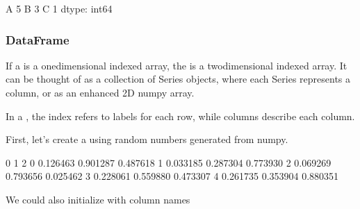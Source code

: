 \documentclass[letterpaper,10pt,english]{sphinxmanual}
\begin{document}
\begin{sphinxVerbatim}[commandchars=\\\{\}]
A    5
B    3
C    1
dtype: int64
\end{sphinxVerbatim}


\subsubsection{DataFrame}
\label{\detokenize{content/Introduction_to_Pandas:dataframe}}
If a  is a one\sphinxhyphen{}dimensional indexed array, the  is a two\sphinxhyphen{}dimensional indexed array. It can be thought of as a collection of Series objects, where each Series represents a column, or as an enhanced 2D numpy array.

In a , the index refers to labels for each row, while columns describe each column.

First, let’s create a  using random numbers generated from numpy.

\begin{sphinxVerbatim}[commandchars=\\\{\}]
   

   
\end{sphinxVerbatim}

\begin{sphinxVerbatim}[commandchars=\\\{\}]
          0         1         2
0  0.126463  0.901287  0.487618
1  0.033185  0.287304  0.773930
2  0.069269  0.793656  0.025462
3  0.228061  0.559880  0.473307
4  0.261735  0.353904  0.880351
\end{sphinxVerbatim}

We could also initialize with column names

\begin{sphinxVerbatim}[commandchars=\\\{\}]
    \PYG{p}{[}  \PYG{p}{]}
\end{sphinxVerbatim}
\end{document}
